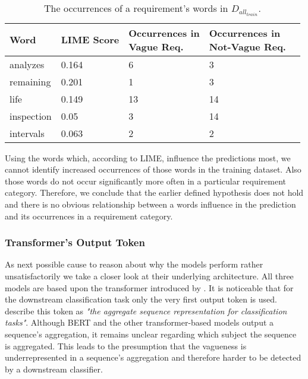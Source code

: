 \begin{table}[htpb]
    \centering
    \begin{tabular}{l | l l l l }
        \toprule
         Word & \ac{LIME} Score & \makecell{Occurrences in\\Vague Req.} & \makecell{Occurrences in\\Not-Vague Req.} \\
        \hline
        analyzes & 0.164 & 6 & 3 \\
        remaining & 0.201 & 1 & 3  \\
        life & 0.149 & 13 & 14\\
        inspection & 0.05 & 3 & 14 \\
        intervals & 0.063 & 2 & 2 \\
        \bottomrule
    \end{tabular}
    \caption[Study Interpretation: Word Occurrences]{The occurrences of a requirement's words in $D_{all_{train}}$.}\label{tab:study:interpretation:LIME}
\end{table}

Using the words which, according to \ac{LIME}, influence the predictions most, we cannot identify increased occurrences of those words in the training dataset.
Also those words do not occur significantly more often in a particular requirement category.
Therefore, we conclude that the earlier defined hypothesis does not hold and there is no obvious relationship between a words influence in the prediction and its occurrences in a requirement category.

\subsubsection{Transformer's Output Token}
\label{chp:study:sec:interpretation:subsec:causes:transformer_ouput_token}
As next possible cause to reason about why the models perform rather unsatisfactorily we take a closer look at their underlying architecture.
All three models are based upon the transformer introduced by \textcite{Vaswani:2017}.
It is noticeable that for the downstream classification task only the very first output token is used.
\Textcite{Devlin:2018} describe this token as \textit{"the aggregate sequence representation for classification tasks"}.
Although \ac{BERT} and the other transformer-based models output a sequence's aggregation, it remains unclear regarding which subject the sequence is aggregated.
This leads to the presumption that the vagueness is underrepresented in a sequence's aggregation and therefore harder to be detected by a downstream classifier.


